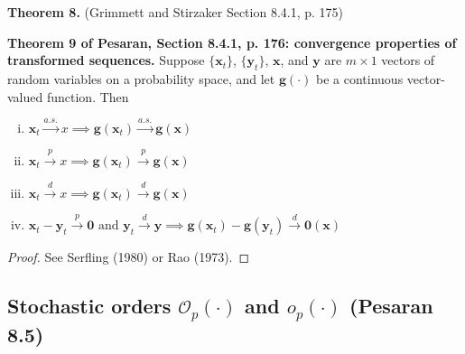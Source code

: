  \textbf{Theorem 8.} (Grimmett and Stirzaker Section 8.4.1, p. 175) 

\begin{theorem} \textbf{Theorem 9 of Pesaran, Section 8.4.1, p. 176: convergence properties of transformed sequences.} Suppose \(\{\boldsymbol{x}_t\}\), \(\{\boldsymbol{y}_t\}\), \(\boldsymbol{x}\), and \(\boldsymbol{y}\) are \(m \times 1\) vectors of random variables on a probability space, and let \(\boldsymbol{g}(\cdot)\) be a continuous vector-valued function. Then

\begin{enumerate}[(i)]

\item \(\boldsymbol{x}_t \xrightarrow{a.s.} x \implies \boldsymbol{g}(\boldsymbol{x}_t) \xrightarrow{a.s.} \boldsymbol{g}(\boldsymbol{x})\)

\item \(\boldsymbol{x}_t \xrightarrow{p} x \implies \boldsymbol{g}(\boldsymbol{x}_t) \xrightarrow{p} \boldsymbol{g}(\boldsymbol{x})\)

\item \(\boldsymbol{x}_t \xrightarrow{d} x \implies \boldsymbol{g}(\boldsymbol{x}_t) \xrightarrow{d} \boldsymbol{g}(\boldsymbol{x})\)

\item \(\boldsymbol{x}_t  - \boldsymbol{y}_t \xrightarrow{p} \boldsymbol{0} \text{ and } \boldsymbol{y}_t \xrightarrow{d} \boldsymbol{y} \implies \boldsymbol{g}(\boldsymbol{x}_t) - \boldsymbol{g}(\boldsymbol{y}_t) \xrightarrow{d} \boldsymbol{0}(\boldsymbol{x})\)

\end{enumerate}

\end{theorem}

\begin{proof}See Serfling (1980) or Rao (1973).\end{proof}


\subsection{Stochastic orders \(\mathcal{O}_p(\cdot)\) and \(o_p(\cdot)\) (Pesaran 8.5)}

